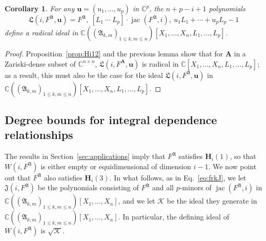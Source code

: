 \documentclass[12pt]{article}
\def\frkJ{\mathfrak{J}}
\def\frkL{\mathfrak{L}}
\def\A{\mathfrak{A}}
\def\mA{{\bm A}}
\def\ub{{\bm u}}
\DeclareMathOperator{\jac}{jac}
\def\C{\mathbb{C}}
\newtheorem{corollary}[theorem]{Corollary}
\begin{document}
\begin{corollary}\label{prop:RadLagPolarVgen}
  For any $\ub = (u_1,\hdots,u_p)$ in $\C^p$, the $n+p-i+1$
  polynomials
  \begin{equation}\label{eqdef:frkLgen}
    {\frkL}(i, F^\A, \bm u) = F^\A,\ [L_1~\cdots~L_p]\cdot \jac(F^\A, i),\ u_1 L_1 + \cdots + u_p L_p -1
  \end{equation}
  define a radical ideal in $\C((\A_{k,m})_{1 \le k,m \le
    n})[X_1,\dots,X_n,L_1,\dots,L_p]$.
\end{corollary}
\begin{proof}
  Proposition~\ref{prop:Hi12} and the previous lemma show that for
  $\mA$ in a Zariski-dense subset of $\C^{n\times n}$, ${\frkL}(i,
  F^\mA, \bm u)$ is radical in $\C[X_1,\dots,X_n,L_1,\dots,L_p]$; as a
  result, this must also be the case for the ideal ${\frkL}(i, F^\A,
  \bm u)$ in $\C((\A_{k,m})_{1 \le k,m \le
    n})[X_1,\dots,X_n,L_1,\dots,L_p]$.
\end{proof}


\subsection{Degree bounds for integral dependence relationships} 

The results in Section~\ref{sec:applications} imply that $F^\A$
satisfies $\bm H_i(1)$, so that $W(i,F^\A)$ is either empty or
equidimensional of dimension $i-1$. We now point out that $F^\A$ also
satisfies $\bm H_i(3)$. In what follows, as in Eq.~\eqref{eq:frkJ}, we
let ${\frkJ}(i,F^\A)$ be the polynomials consisting of $F^\A$ and all
$p$-minors of $\jac(F^\A,i)$ in $\C((\A_{k,m})_{1 \le k,m \le
  n})[X_1,\dots,X_n]$, and we let $\mathscr{K}$ be the ideal they
generate in $\C((\A_{k,m})_{1 \le k,m \le n})[X_1,\dots,X_n]$.  In
particular, the defining ideal of $W(i,F^\A)$ is $\sqrt{\mathscr{K}}$.
\end{document}
